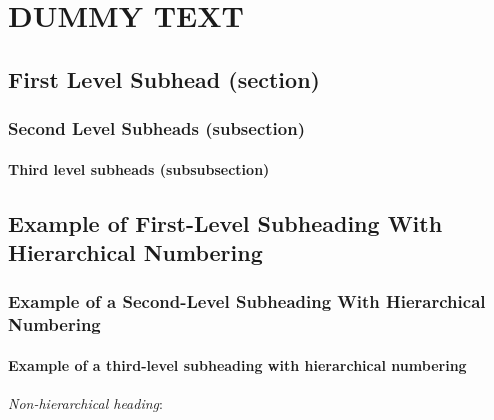 \clearpage
\chapter{DUMMY TEXT}
\doublespacing

\lipsum[1-2]

\section*{First Level Subhead (section)}
\lipsum[2-3]

\subsection*{Second Level Subheads (subsection)}
\lipsum[4-5]

\subsubsection*{Third level subheads (subsubsection)}
\lipsum[6-7]

\section{Example of First-Level Subheading With Hierarchical Numbering}
\lipsum[7-8]

\subsection{Example of a Second-Level Subheading With Hierarchical Numbering}
\lipsum[8-9]

\subsubsection{Example of a third-level subheading with hierarchical numbering}
\lipsum[9-10]

\textit{Non-hierarchical heading}: \lipsum[11-11]
